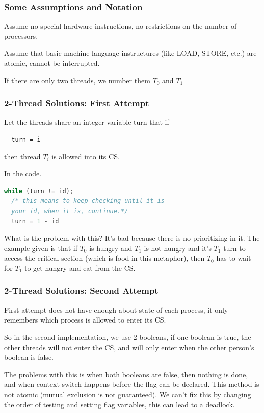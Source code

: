 \documentclass{article}
\begin{document}
\subsubsection{Some Assumptions and Notation}

Assume no special hardware instructions, no restrictions on the number of processors.

Assume that basic machine language instructures (like LOAD, STORE, etc.) are atomic, cannot be interrupted.

If there are only two threads, we number them $T_0$ and $T_1$

\subsubsection{2-Thread Solutions: First Attempt}

Let the threads share an integer variable turn that if
\begin{lstlisting}
  turn = i
\end{lstlisting}
then thread $T_i$ is allowed into its CS.

In the code.
\begin{lstlisting}[language=c]
  while (turn != id);
  /* this means to keep checking until it is
  your id, when it is, continue.*/
  turn = 1 - id
\end{lstlisting}

What is the problem with this? It's bad because there is no prioritizing in it. The example given is that if $T_0$ is hungry and $T_1$ is not hungry and it's $T_1$ turn to access the critical section (which is food in this metaphor), then $T_0$ has to wait for $T_1$ to get hungry and eat from the CS.

\subsubsection{2-Thread Solutions: Second Attempt}

First attempt does not have enough about state of each process, it only remembers which process is allowed to enter its CS.

So in the second implementation, we use 2 booleans, if one boolean is true, the other threads will not enter the CS, and will only enter when the other person's boolean is false.

The problems with this is when both booleans are false, then nothing is done, and when context switch happens before the flag can be declared. This method is not atomic (mutual exclusion is not guaranteed). We can't fix this by changing the order of testing and setting flag variables, this can lead to a deadlock.
\end{document}
